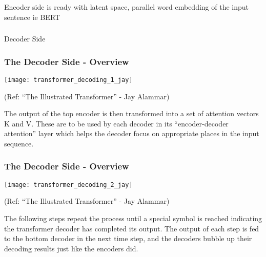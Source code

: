 
			
		


\begin{frame}[fragile]\frametitle{}
\begin{center}
{\Large Encoder side is ready with latent space, parallel word embedding of the input sentence ie BERT}
\end{center}
\end{frame}




\begin{frame}[fragile]\frametitle{}
\begin{center}
{\Large Decoder Side}
\end{center}
\end{frame}

\begin{frame}[fragile]\frametitle{The Decoder Side - Overview}


\begin{center}
\texttt{[image: transformer\_decoding\_1\_jay]}


{\tiny (Ref: ``The Illustrated Transformer'' - Jay Alammar)}
\end{center}	


The output of the top encoder is then transformed into a set of attention vectors K and V. These are to be used by each decoder in its “encoder-decoder attention” layer which helps the decoder focus on appropriate places in the input sequence.

\end{frame}

\begin{frame}[fragile]\frametitle{The Decoder Side - Overview}


\begin{center}
\texttt{[image: transformer\_decoding\_2\_jay]}


{\tiny (Ref: ``The Illustrated Transformer'' - Jay Alammar)}
\end{center}	


The following steps repeat the process until a special symbol is reached indicating the transformer decoder has completed its output. The output of each step is fed to the bottom decoder in the next time step, and the decoders bubble up their decoding results just like the encoders did.
\end{frame}

